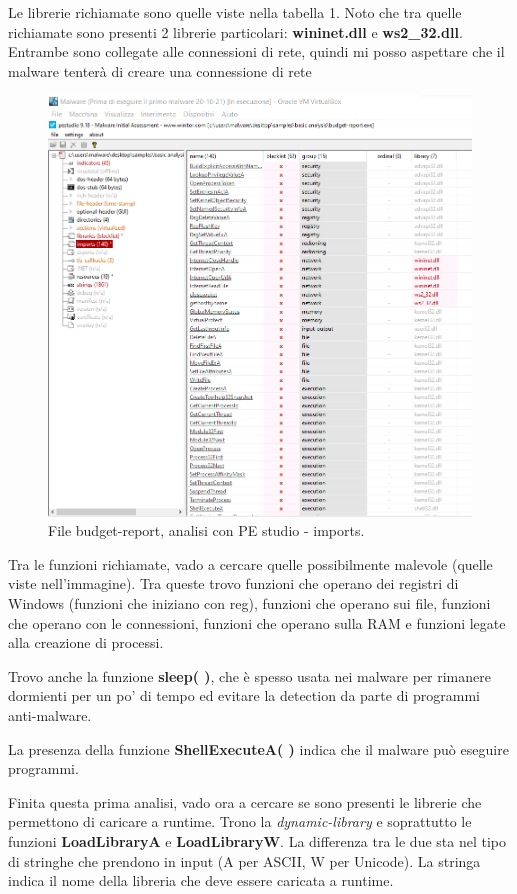 \documentclass[a4paper]{book}
\begin{document}
Le librerie richiamate sono quelle viste nella tabella 1. Noto che tra quelle richiamate sono presenti 2 librerie particolari: \textbf{wininet.dll} e \textbf{ws2\_32.dll}. Entrambe sono collegate alle connessioni di rete, quindi mi posso aspettare che il malware tenterà di creare una connessione di rete

\begin{figure}[p]
    \includegraphics[width=1\textwidth]{images/13-10/7.png}
    \caption{File budget-report, analisi con PE studio - imports.}
\end{figure}

Tra le funzioni richiamate, vado a cercare quelle possibilmente malevole (quelle viste nell'immagine). Tra queste trovo funzioni che operano dei registri di Windows (funzioni che iniziano con reg), funzioni che operano sui file, funzioni che operano con le connessioni, funzioni che operano sulla RAM e funzioni legate alla creazione di processi.

Trovo anche la funzione \textbf{sleep( )}, che è spesso usata nei malware per rimanere dormienti per un po' di tempo ed evitare la detection da parte di programmi anti-malware.

La presenza della funzione \textbf{ShellExecuteA( )} indica che il malware può eseguire programmi. 

Finita questa prima analisi, vado ora a cercare se sono presenti le librerie che permettono di caricare a runtime. Trono la \textit{dynamic-library} e soprattutto le funzioni \textbf{LoadLibraryA} e \textbf{LoadLibraryW}. La differenza tra le due sta nel tipo di stringhe che prendono in input (A per ASCII, W per Unicode). La stringa indica il nome della libreria che deve essere caricata a runtime. 
\end{document}
